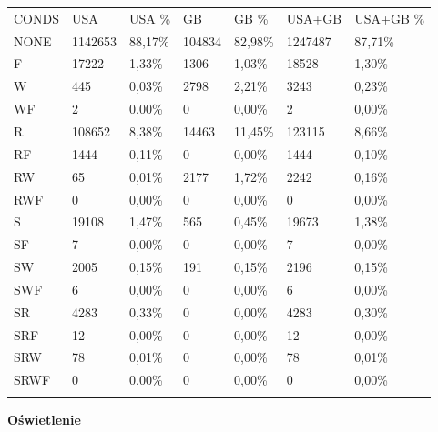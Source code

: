 \begin{longtable}[c]{@{}lllllll@{}}
\toprule\addlinespace
CONDS & USA & USA \% & GB & GB \% & USA+GB & USA+GB \%
\\\addlinespace
\midrule\endhead
NONE & 1142653 & 88,17\% & 104834 & 82,98\% & 1247487 & 87,71\%
\\\addlinespace
F & 17222 & 1,33\% & 1306 & 1,03\% & 18528 & 1,30\%
\\\addlinespace
W & 445 & 0,03\% & 2798 & 2,21\% & 3243 & 0,23\%
\\\addlinespace
WF & 2 & 0,00\% & 0 & 0,00\% & 2 & 0,00\%
\\\addlinespace
R & 108652 & 8,38\% & 14463 & 11,45\% & 123115 & 8,66\%
\\\addlinespace
RF & 1444 & 0,11\% & 0 & 0,00\% & 1444 & 0,10\%
\\\addlinespace
RW & 65 & 0,01\% & 2177 & 1,72\% & 2242 & 0,16\%
\\\addlinespace
RWF & 0 & 0,00\% & 0 & 0,00\% & 0 & 0,00\%
\\\addlinespace
S & 19108 & 1,47\% & 565 & 0,45\% & 19673 & 1,38\%
\\\addlinespace
SF & 7 & 0,00\% & 0 & 0,00\% & 7 & 0,00\%
\\\addlinespace
SW & 2005 & 0,15\% & 191 & 0,15\% & 2196 & 0,15\%
\\\addlinespace
SWF & 6 & 0,00\% & 0 & 0,00\% & 6 & 0,00\%
\\\addlinespace
SR & 4283 & 0,33\% & 0 & 0,00\% & 4283 & 0,30\%
\\\addlinespace
SRF & 12 & 0,00\% & 0 & 0,00\% & 12 & 0,00\%
\\\addlinespace
SRW & 78 & 0,01\% & 0 & 0,00\% & 78 & 0,01\%
\\\addlinespace
SRWF & 0 & 0,00\% & 0 & 0,00\% & 0 & 0,00\%
\\\addlinespace
\bottomrule
\end{longtable}

\textbf{Oświetlenie}

